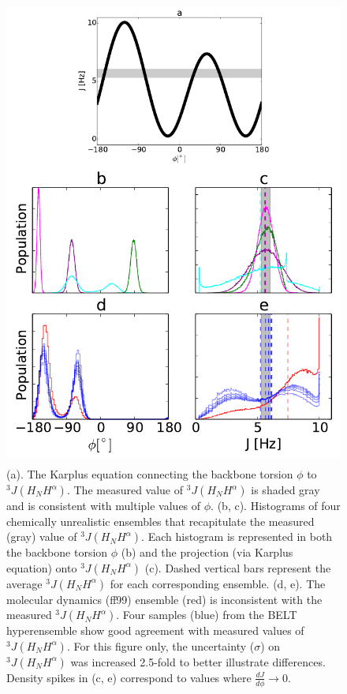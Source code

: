 \documentclass[12pt]{article}
\begin{document}
\begin{figure}

\includegraphics[height=15.5cm]{figure_layouts/figure1.pdf}

\caption{
(a).  The Karplus equation connecting the backbone torsion $\phi$ to $^3J(H_NH^\alpha)$.  The measured value of $^3J(H_NH^\alpha)$ is shaded gray and is consistent with multiple values of $\phi$.  (b, c).  Histograms of four chemically unrealistic ensembles that recapitulate the measured (gray) value of $^3J(H_NH^\alpha)$.  Each histogram is represented in both the backbone torsion $\phi$ (b) and the projection (via Karplus equation) onto $^3J(H_NH^\alpha)$ (c).  Dashed vertical bars represent the average $^3J(H_NH^\alpha)$ for each corresponding ensemble.  (d, e).  The molecular dynamics (ff99) ensemble (red) is inconsistent with the measured $^3J(H_NH^\alpha)$.  Four samples (blue) from the BELT hyperensemble show good agreement with measured values of $^3J(H_NH^\alpha)$.  For this figure only, the uncertainty ($\sigma$) on $^3J(H_NH^\alpha)$ was increased 2.5-fold to better illustrate differences.  Density spikes in (c, e) correspond to values where $\frac{dJ}{d\phi} \rightarrow 0$.  
}
\label{figure:Ambiguity}
\end{figure}
\end{document}
